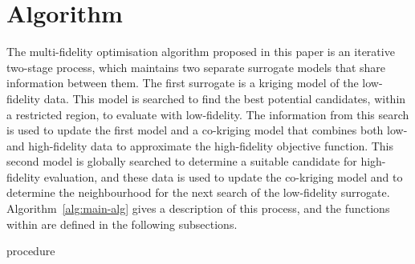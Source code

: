 \section{\AlgName{} Algorithm}\label{sec:method}
The multi-fidelity optimisation algorithm proposed in this paper is an iterative two-stage process, which maintains two separate surrogate models that share information between them. The first surrogate is a kriging model of the low-fidelity data. This model is searched to find the best potential candidates, within a restricted region, to evaluate with low-fidelity. The information from this search is used to update the first model and a co-kriging model that combines both low- and high-fidelity data to approximate the high-fidelity objective function. This second model is globally searched to determine a suitable candidate for high-fidelity evaluation, and these data is used to update the co-kriging model and to determine the neighbourhood for the next search of the low-fidelity surrogate. Algorithm~\ref{alg:main-alg} gives a description of this process, and the functions within are defined in the following subsections.

\begin{algorithm}[h!]
\caption{\AlgName{} procedure}
\label{alg:main-alg}
{\footnotesize 
\begin{algorithmic}[1]
 
 
  
   
   
   
   
   
   
   
   
     
  \ENDIF
\ENDWHILE
\end{algorithmic}
}
\end{algorithm}


